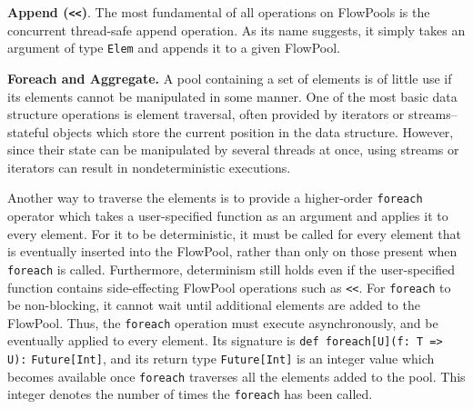 \textbf{Append (\texttt{<<})}. The most fundamental of all
operations on FlowPools is the concurrent thread-safe append operation.
As its name suggests, it
simply takes an argument of type \texttt{Elem} and appends it to a given
FlowPool.



\textbf{Foreach and Aggregate.}
A pool containing a set of elements is of little use if its elements cannot be
manipulated in some manner. One of the most basic data structure operations is
element traversal, often provided by iterators or streams-- stateful objects
which store the current position in the data structure. However, since their
state can be manipulated by several threads at once, using streams or iterators can
result in nondeterministic executions.

Another way to traverse the elements is to provide a higher-order
\verb=foreach= operator which takes a user-specified function as an argument
and applies it to every element. For it to be deterministic, it must be called
for every element that is eventually inserted into the FlowPool, rather than
only on those present when \verb=foreach= is called. Furthermore, determinism
still holds even if the user-specified function contains side-effecting
FlowPool operations such as \texttt{<<}. For \verb=foreach= to be
non-blocking, it cannot wait until additional elements are added to the
FlowPool. Thus, the \verb=foreach= operation must execute
asynchronously, and be eventually applied to every element. Its signature is
\verb+def foreach[U](f: T => U):+ \verb+Future[Int]+, and its  return type
\verb=Future[Int]= is an integer value which becomes available once
\verb=foreach= traverses all the elements added to the pool. This integer
denotes the number of times the \verb=foreach= has been called.


